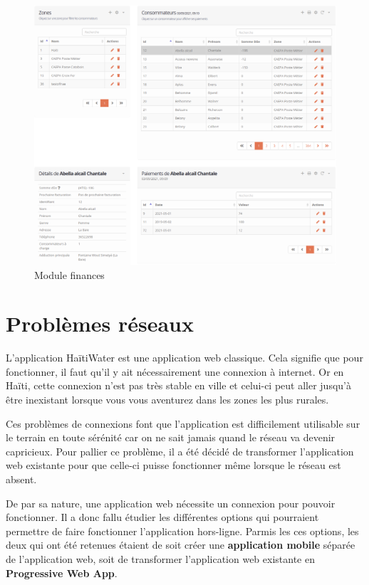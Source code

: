 \documentclass{EPL-master-thesis-covers-FR}
\begin{document}
				\begin{figure}[H]
					\centering
					\includegraphics[width=1\textwidth]{images/finances}
					\caption{Module finances}
				\end{figure}
				
				
		\section{Problèmes réseaux}
			L'application HaïtiWater est une application web classique. Cela signifie que pour fonctionner, il faut qu'il y ait nécessairement une connexion à internet. Or en Haïti, cette connexion n'est pas très stable en ville et celui-ci peut aller jusqu'à être inexistant lorsque vous vous aventurez dans les zones les plus rurales. 
			
			Ces problèmes de connexions font que l'application est difficilement utilisable sur le terrain en toute sérénité car on ne sait jamais quand le réseau va devenir capricieux. Pour pallier ce problème, il a été décidé de transformer l'application web existante pour que celle-ci puisse fonctionner même lorsque le réseau est absent.
				
			De par sa nature, une application web nécessite un connexion pour pouvoir fonctionner. Il a donc fallu étudier les différentes options qui pourraient permettre de faire fonctionner l'application hors-ligne. Parmis les ces options,  les deux qui ont été retenues étaient de soit créer une \textbf{application mobile} séparée de l'application web, soit de transformer l'application web existante en \textbf{Progressive Web App}. 
				
\end{document}
